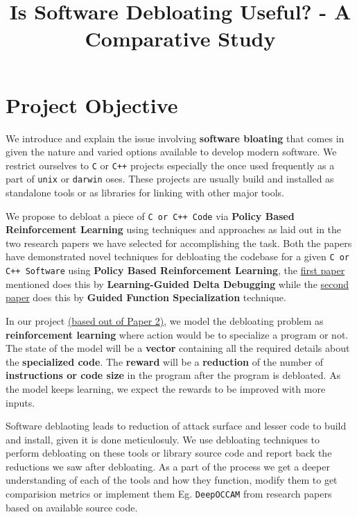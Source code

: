 \documentclass{relatorio}
\title{Is Software Debloating Useful? - A Comparative Study}
\begin{document}
	
	\onecolumn
	\tableofcontents
	\twocolumn  
	
	\maketitle{}

\section{Project Objective}%

We introduce and explain the issue involving \textbf{software bloating} that comes in given the nature and varied options 
available to develop modern software. We restrict ourselves to \texttt{C} or \texttt{C++} projects especially the once used frequently
as a part of \texttt{unix} or \texttt{darwin} oses. These projects are usually build and installed as standalone tools or as libraries 
for linking with other major tools. 

We propose to debloat a piece of \texttt{C or C++ Code} via \textbf{Policy Based Reinforcement Learning} using techniques and approaches as laid out in the two research papers we have selected for accomplishing the task. Both the papers have demonstrated novel techniques for debloating the codebase for a given \texttt{C or C++ Software} using \textbf{Policy Based Reinforcement Learning}, the \href{https://dl.acm.org/doi/10.1145/3243734.3243838}{first paper} mentioned does this by \textbf{Learning-Guided Delta Debugging}  while the \href{http://www.csl.sri.com/users/gehani/papers/MLSys-2019.DeepOCCAM.pdf}{second paper} does this by \textbf{Guided Function Specialization} technique. 

In our project \href{http://www.csl.sri.com/users/gehani/papers/MLSys-2019.DeepOCCAM.pdf}{(based out of Paper 2)}, we model the debloating problem as \textbf{reinforcement learning} where action would be to specialize a program or not. The state of the model will be a \textbf{vector} containing all the required details about the \textbf{specialized code}. The \textbf{reward} will be a \textbf{reduction} of the number of \textbf{instructions or code size} in the program after the program is debloated. As the model keeps learning, we expect the rewards to be improved with more inputs. 

Software deblaoting leads to reduction of attack surface and lesser code to build and install, given it is done meticulosuly. We use debloating 
techniques to perform debloating on these tools or library source code and report back the reductions we saw after debloating. As a part of the process
we get a deeper understanding of each of the tools and  how they function, modify them to get comparision metrics or implement them Eg. \texttt{DeepOCCAM} 
from research papers based on available source code. 
\end{document}
